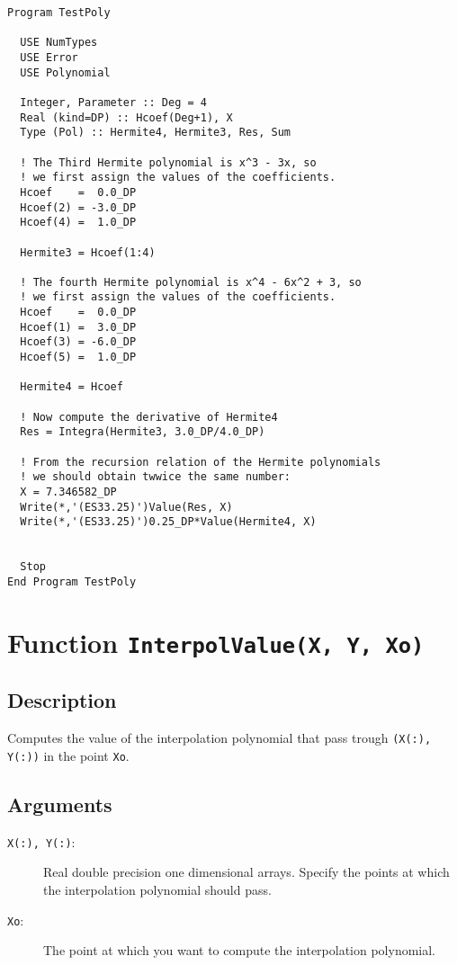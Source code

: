 \begin{lstlisting}[emph=Integra,
                   emphstyle=\color{blue},
                   frame=trBL,
                   caption=Computing the integral of a polynomial.,
                   label=integrapol]
Program TestPoly

  USE NumTypes
  USE Error
  USE Polynomial

  Integer, Parameter :: Deg = 4
  Real (kind=DP) :: Hcoef(Deg+1), X
  Type (Pol) :: Hermite4, Hermite3, Res, Sum

  ! The Third Hermite polynomial is x^3 - 3x, so
  ! we first assign the values of the coefficients.
  Hcoef    =  0.0_DP
  Hcoef(2) = -3.0_DP
  Hcoef(4) =  1.0_DP

  Hermite3 = Hcoef(1:4)

  ! The fourth Hermite polynomial is x^4 - 6x^2 + 3, so
  ! we first assign the values of the coefficients.
  Hcoef    =  0.0_DP
  Hcoef(1) =  3.0_DP
  Hcoef(3) = -6.0_DP
  Hcoef(5) =  1.0_DP

  Hermite4 = Hcoef

  ! Now compute the derivative of Hermite4
  Res = Integra(Hermite3, 3.0_DP/4.0_DP)

  ! From the recursion relation of the Hermite polynomials 
  ! we should obtain twwice the same number:
  X = 7.346582_DP
  Write(*,'(ES33.25)')Value(Res, X)
  Write(*,'(ES33.25)')0.25_DP*Value(Hermite4, X)
  

  Stop
End Program TestPoly
\end{lstlisting}

\section{Function \texttt{InterpolValue(X, Y, Xo)}}

\subsection{Description}

Computes the value of the interpolation polynomial that pass trough
\texttt{(X(:), Y(:))} in the point \texttt{Xo}.

\subsection{Arguments}

\begin{description}
\item[\texttt{X(:), Y(:)}:] Real double precision one dimensional
  arrays. Specify the points at which the interpolation polynomial
  should pass. 
\item[\texttt{Xo}:] The point at which you want to compute the
  interpolation polynomial.
\end{description}


